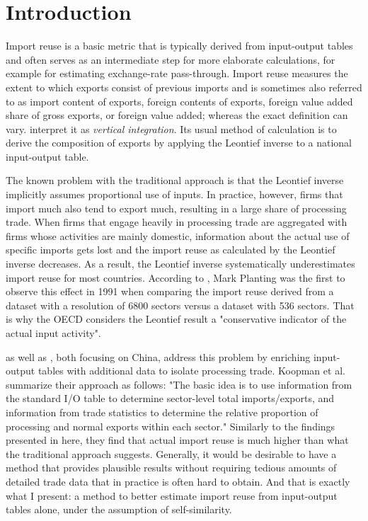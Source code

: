\documentclass[english]{uzhpub}
\begin{document}
\section{Introduction}
Import reuse is a basic metric that is typically derived from input-output tables and often serves as an intermediate step for more elaborate calculations, for example for estimating exchange-rate pass-through. \citep{auer2016international} Import reuse measures the extent to which exports consist of previous imports and is sometimes also referred to as import content of exports, foreign contents of exports, foreign value added share of gross exports, or foreign value added; whereas the exact definition can vary. \cite{hummels2001nature} interpret it as \emph{vertical integration}. Its usual method of calculation is to derive the composition of exports by applying the Leontief inverse to a national input-output table.

The known problem with the traditional approach is that the Leontief inverse implicitly assumes proportional use of inputs. In practice, however, firms that import much also tend to export much, resulting in a large share of processing trade. \citep{amiti2012importers} When firms that engage heavily in processing trade are aggregated with firms whose activities are mainly domestic, information about the actual use of specific imports gets lost and the import reuse as calculated by the Leontief inverse decreases. As a result, the Leontief inverse systematically underestimates import reuse for most countries. According to \cite{oecd2000}, Mark Planting was the first to observe this effect in 1991 when comparing the import reuse derived from a dataset with a resolution of 6800 sectors versus a dataset with 536 sectors. That is why the OECD considers the Leontief result a "conservative indicator of the actual input activity".

\cite{koopman2012estimating} as well as \cite{kee2013domestic}, both focusing on China, address this problem by enriching input-output tables with additional data to isolate processing trade. Koopman et al. summarize their approach as follows: "The basic idea is to use information from the standard I/O table to determine sector-level total imports/exports, and information from trade statistics to determine the relative proportion of processing and normal exports within each sector." Similarly to the findings presented in here, they find that actual import reuse is much higher than what the traditional approach suggests. Generally, it would be desirable to have a method that provides plausible results without requiring tedious amounts of detailed trade data that in practice is often hard to obtain. And that is exactly what I present: a method to better estimate import reuse from input-output tables alone, under the assumption of self-similarity.
\end{document}

